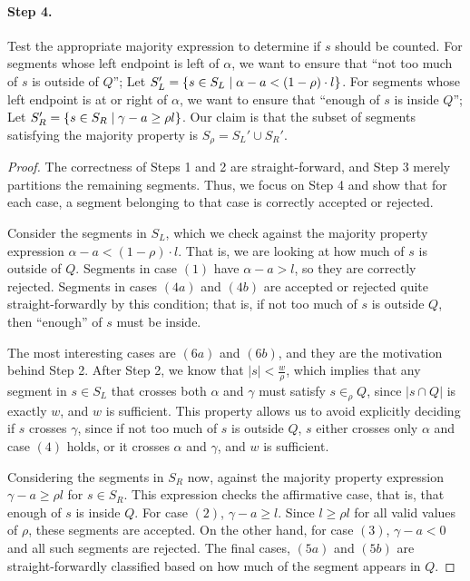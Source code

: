 \paragraph{Step 4.} Test the appropriate majority expression to determine if $s$ should be counted. For segments whose left endpoint is left of $\alpha$, we want to ensure that ``not too much of $s$ is outside of $Q$''; Let $S_L' = \{ s \in S_L \;|\; \alpha - a < (1 - \rho) \cdot l\}$. For segments whose left endpoint is at or right of $\alpha$, we want to ensure that ``enough of $s$ is inside $Q$''; Let $S_R' = \{ s \in S_R \;|\; \gamma - a \geq  \rho l \}$. Our claim is that the subset of segments satisfying the majority property is $S_\rho = S_L' \cup S_R'$. 

\begin{proof}
The correctness of Steps 1 and 2 are straight-forward, and Step 3 merely partitions the remaining segments. Thus, we focus on Step 4 and show that for each case, a segment belonging to that case is correctly accepted or rejected.

Consider the segments in $S_L$, which we check against the majority property expression $\alpha - a < (1 - \rho) \cdot l$. That is, we are looking at how much of $s$ is outside of $Q$. Segments in case $(1)$ have $\alpha - a > l$, so they are correctly rejected. Segments in cases $(4a)$ and $(4b)$ are accepted or rejected quite straight-forwardly by this condition; that is, if not too much of $s$ is outside $Q$, then ``enough'' of $s$ must be inside.  

The most interesting cases are $(6a)$ and $(6b)$, and they are the motivation behind Step 2.  After Step 2, we know that $|s| < \frac{w}{\rho}$, which implies that any segment in $s \in S_L$ that crosses both $\alpha$ and $\gamma$ must satisfy $s \in_\rho Q$, since $|s \cap Q|$ is exactly $w$, and $w$ is sufficient. This property allows us to avoid explicitly deciding if $s$ crosses $\gamma$, since if not too much of $s$ is outside $Q$, $s$ either crosses only $\alpha$ and case $(4)$ holds, or it crosses $\alpha$ and $\gamma$, and $w$ is sufficient.

Considering the segments in $S_R$ now, against the majority property expression $\gamma - a \geq  \rho l$ for $s \in S_R$. This expression checks the affirmative case, that is, that enough of $s$ is inside $Q$. For case $(2)$, $\gamma - a \geq l$. Since $l \geq \rho l$ for all valid values of $\rho$, these segments are accepted.  On the other hand, for case $(3)$, $\gamma - a < 0$ and all such segments are rejected. The final cases, $(5a)$ and $(5b)$ are straight-forwardly classified based on how much of the segment appears in $Q$.

\end{proof}


